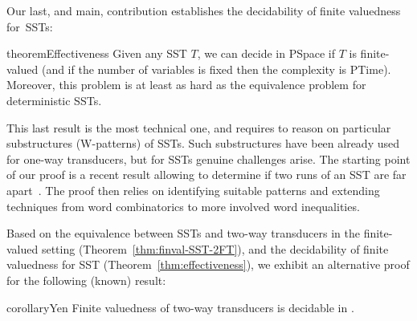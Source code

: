 \documentclass{article}
\newcommand{\RestateRemark}[1]{{\normalfont\bfseries #1}}
\newcommand{\RestateInit}[1]{\newcommand{#1}{}}
\begin{document}
    Our last, and main, contribution establishes the decidability
    of finite valuedness for~SSTs:%


\RestateInit{\restateEffectiveness}
\begin{restatable}{theorem}{Effectiveness}
	\label{thm:effectiveness}\RestateRemark{\restateEffectiveness}
      Given any SST $T$, we can decide in {\upshape\sc PSpace}
      if $T$ is
      finite-valued (and if the number of variables
      is fixed then the complexity is {\upshape\sc PTime}). 
      Moreover, this problem is at least as hard as the
      equivalence problem for deterministic SSTs. 
    \end{restatable}

    This last result is the most technical one, and requires to reason
    on particular substructures (W-patterns) of SSTs.
    Such substructures %
    have  been already  used for one-way transducers, 
    but for SSTs genuine challenges arise.
    The starting point of our  proof is a
    recent result allowing to determine if two runs of
    an SST are
    far apart~\cite{SSTdelay}.
    The proof then relies on identifying suitable patterns and
    extending techniques from word combinatorics to more involved
    word inequalities. 
    



    Based on the equivalence between SSTs and two-way transducers in the
    finite-valued setting (Theorem~\ref{thm:finval-SST-2FT}), and the
    decidability of finite valuedness for SST
    (Theorem~\ref{thm:effectiveness}), we exhibit 
    an alternative proof for the following (known)
    result:

  
    \RestateInit{\restateYen}
\begin{restatable}{corollary}{Yen}
	  \label{thm:finval-twoway}\RestateRemark{\restateYen}
      Finite valuedness of two-way transducers is decidable in .
    \end{restatable}
\end{document}
